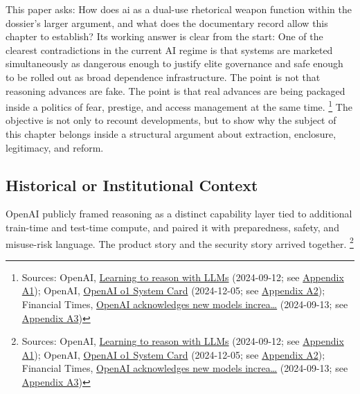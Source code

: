\documentclass[
  american,
  11pt,
  letterpaper,
]{article}
\begin{document}
This paper asks: How does ai as a dual-use rhetorical weapon function
within the dossier's larger argument, and what does the documentary
record allow this chapter to establish? Its working answer is clear from
the start: One of the clearest contradictions in the current AI regime
is that systems are marketed simultaneously as dangerous enough to
justify elite governance and safe enough to be rolled out as broad
dependence infrastructure. The point is not that reasoning advances are
fake. The point is that real advances are being packaged inside a
politics of fear, prestige, and access management at the same time.
\footnote{Sources: OpenAI,
  \href{https://openai.com/index/learning-to-reason-with-llms/}{Learning
  to reason with LLMs} (2024-09-12; see
  \hyperref[appendix-a1-learning-to-reason-with-llms]{Appendix A1});
  OpenAI, \href{https://openai.com/index/openai-o1-system-card/}{OpenAI
  o1 System Card} (2024-12-05; see
  \hyperref[appendix-a2-openai-o1-system-card]{Appendix A2}); Financial
  Times,
  \href{https://www.ft.com/content/37ba7236-2a64-4807-b1e1-7e21ee7d0914}{OpenAI
  acknowledges new models increa\ldots{}} (2024-09-13; see
  \hyperref[appendix-a3-openai-acknowledges-new-models-increase-risk-of-misuse-to-create-bioweapons]{Appendix
  A3})} The objective is not only to recount developments, but to show
why the subject of this chapter belongs inside a structural argument
about extraction, enclosure, legitimacy, and reform.

\subsection{Historical or Institutional
Context}\label{historical-or-institutional-context}

OpenAI publicly framed reasoning as a distinct capability layer tied to
additional train-time and test-time compute, and paired it with
preparedness, safety, and misuse-risk language. The product story and
the security story arrived together. \footnote{Sources: OpenAI,
  \href{https://openai.com/index/learning-to-reason-with-llms/}{Learning
  to reason with LLMs} (2024-09-12; see
  \hyperref[appendix-a1-learning-to-reason-with-llms]{Appendix A1});
  OpenAI, \href{https://openai.com/index/openai-o1-system-card/}{OpenAI
  o1 System Card} (2024-12-05; see
  \hyperref[appendix-a2-openai-o1-system-card]{Appendix A2}); Financial
  Times,
  \href{https://www.ft.com/content/37ba7236-2a64-4807-b1e1-7e21ee7d0914}{OpenAI
  acknowledges new models increa\ldots{}} (2024-09-13; see
  \hyperref[appendix-a3-openai-acknowledges-new-models-increase-risk-of-misuse-to-create-bioweapons]{Appendix
  A3})}
\end{document}

